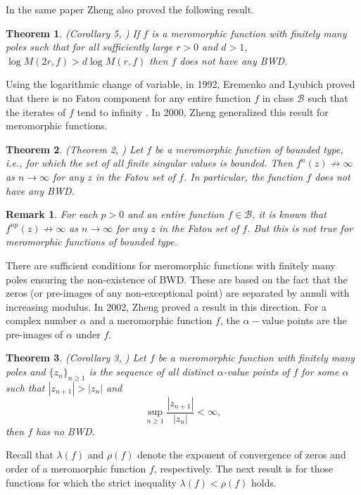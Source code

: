 \documentclass[11pt,a4paper]{article}
\newtheorem{theorem}{Theorem}[section]
\newtheorem{Remark}{Remark}[section]
\begin{document}
 	In the same paper Zheng also proved the following result.
 		\begin{theorem}{(Corollary 5, \cite{Zheng 2006})}
 			If $f$ is a meromorphic function with finitely many poles such that for all sufficiently large $r>0$ and $d>1$, $\log M(2r,f)>d\log M(r,f)$ then
 			$f$ does not have any BWD. 
 	\end{theorem} 
	\par Using the logarithmic change of variable, in 1992, Eremenko and Lyubich proved that there is no Fatou component for any entire function $f$ in class $\mathcal{B}$ such that the iterates of $f$ tend to infinity \cite{EremenkoLyubich 1992}. In 2000, Zheng generalized this result for meromorphic functions.
	\begin{theorem}(Theorem 2, \cite{Zheng 2000})
		Let  $f $ be a meromorphic function of bounded type, i.e., for which the set of all finite singular values is bounded. Then  $ f^n(z) \not\to \infty$ as $n \to \infty$ for any $z$ in the Fatou set of $f$. In particular, the function $f$ does not have any BWD.
		\label{B-NoBWD}
	\end{theorem}
	\begin{Remark}
	For each $p>0$ and an entire function  $f\in\mathcal{B}$,  it is known that  $ f^{np}(z) \not \to \infty$ as $n \to \infty$ for any $z $ in the Fatou set of $f$. But this is not true for meromorphic functions of bounded type. 
	\end{Remark}
		There  are sufficient conditions  for meromorphic functions with finitely many poles ensuring the non-existence of BWD. These are based on the fact that the zeros (or pre-images of any  non-exceptional point) are separated by annuli with increasing modulus.
	In 2002, Zheng proved a result in this direction. For a complex number $\alpha$ and a meromorphic function $f$, the $\alpha-$value points are the pre-images of $\alpha$ under $f$.
	\begin{theorem}(Corollary 3, \cite{Zheng 2002})\label{Zheng 02}\label{Thm 4.6}
		Let $f$ be a meromorphic function with finitely many poles and $\{z_n\}_{n\geq 1}$ is the sequence of all distinct $\alpha$-value points of $f$ for some  $\alpha$ such that  $|z_{n+1}|>|z_n|$ and $$\sup_{n\geq 1}{\frac{|z_{n+1}|}{|z_n|}<\infty} ,$$ then $f$ has no BWD.
	\end{theorem}
 Recall that $\lambda(f)$ and $\rho(f)$ denote the exponent of convergence of zeros and order of a meromorphic function $f$, respectively.  The next result is for those functions for which the strict inequality $\lambda(f)< \rho(f)$ holds.
\end{document}
